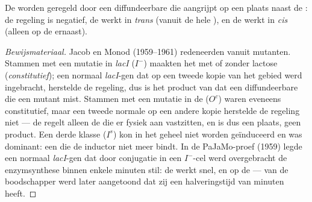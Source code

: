 \begin{proposition}\label{prop:b1:expression-control:jacobmonod}
De  worden geregeld door een diffundeerbare  die aangrijpt op een
plaats naast de : de regeling is negatief, de  werkt in \emph{trans}
(vanuit de hele ), en de  werkt in \emph{cis} (alleen op de  ernaast).
\end{proposition}
\begin{proof}[Bewijsmateriaal]
Jacob en Monod (1959--1961) redeneerden vanuit mutanten. Stammen met een mutatie in
\emph{lacI} ($I^-$) maakten het  met of zonder lactose (\emph{constitutief});
een normaal \emph{lacI}-gen dat op een tweede kopie van het gebied werd
ingebracht, herstelde de regeling, dus is het product van dat  een
diffundeerbare  die een mutant mist. Stammen met een mutatie in de
 ($O^c$) waren eveneens constitutief, maar een tweede normale  op
een andere kopie herstelde de regeling niet --- de  regelt alleen de 
die er fysiek aan vastzitten, en is dus een plaats, geen product. Een derde klasse
($I^s$) kon in het geheel niet worden geïnduceerd en was dominant: een 
die de inductor niet meer bindt. In de PaJaMo-proef (1959) legde een normaal
\emph{lacI}-gen dat door conjugatie in een $I^-$-cel werd overgebracht de
enzymsynthese binnen enkele minuten stil: de  werkt snel, en op de
 --- van de boodschapper werd later aangetoond dat zij een
halveringstijd van minuten heeft.
\end{proof}


